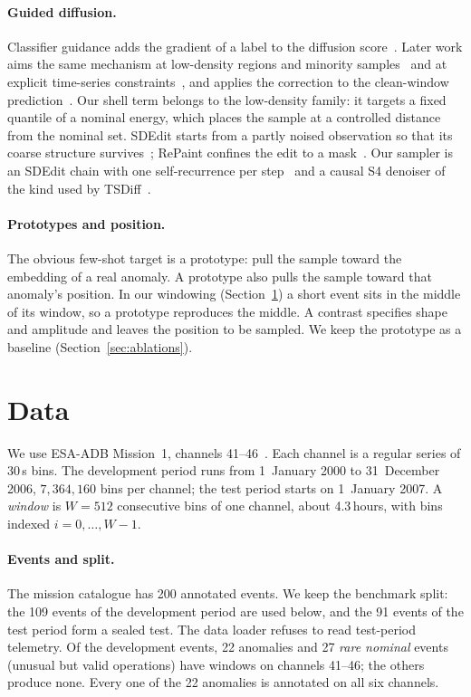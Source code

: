 \documentclass[11pt,a4paper]{article}
\begin{document}
\paragraph{Guided diffusion.}
Classifier guidance adds the gradient of a label to the diffusion
score~\cite{dhariwal2021diffusion}. Later work aims the same mechanism at
low-density regions and minority samples~\cite{sehwag2022low,um2023minority}
and at explicit time-series constraints~\cite{coletta2023guided}, and applies
the correction to the clean-window
prediction~\cite{chung2023dps,bansal2023universal}. Our shell term belongs to
the low-density family: it targets a fixed quantile of a nominal energy, which
places the sample at a controlled distance from the nominal set. SDEdit starts
from a partly noised observation so that its coarse structure
survives~\cite{meng2022sdedit}; RePaint confines the edit to a
mask~\cite{lugmayr2022repaint}. Our sampler is an SDEdit chain with one
self-recurrence per step~\cite{bansal2023universal} and a causal S4 denoiser of
the kind used by TSDiff~\cite{gu2022s4,kollovieh2023tsdiff}.

\paragraph{Prototypes and position.}
The obvious few-shot target is a prototype: pull the sample toward the
embedding of a real anomaly. A prototype also pulls the sample toward that
anomaly's position. In our windowing (Section~\ref{sec:data}) a short event
sits in the middle of its window, so a prototype reproduces the middle. A
contrast specifies shape and amplitude and leaves the position to be sampled.
We keep the prototype as a baseline (Section~\ref{sec:ablations}).

\section{Data}
\label{sec:data}

We use ESA-ADB Mission~1, channels 41--46~\cite{kotowski2024esa}. Each channel
is a regular series of 30\,s bins. The development period runs from 1~January
2000 to 31~December 2006, $7{,}364{,}160$ bins per channel; the test period
starts on 1~January 2007. A \emph{window} is $W = 512$ consecutive bins of one
channel, about 4.3\,hours, with bins indexed $i = 0, \ldots, W - 1$.

\paragraph{Events and split.}
The mission catalogue has 200 annotated events. We keep the benchmark split:
the 109 events of the development period are used below, and the 91 events of
the test period form a sealed test. The data loader refuses to read test-period
telemetry. Of the development events, 22 anomalies and 27 \emph{rare nominal}
events (unusual but valid operations) have windows on channels 41--46; the
others produce none. Every one of the 22 anomalies is annotated on all six
channels.
\end{document}
